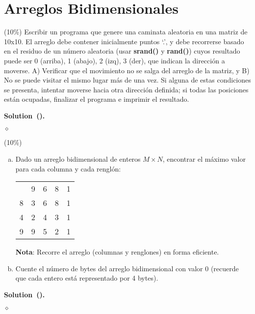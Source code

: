 \documentclass{article}
\theoremstyle{problemstyle}
\newenvironment{solution}[2]{%
  \begin{mdframed}[linewidth=0.8pt,linecolor=Gray,backgroundcolor=Gray!5,roundcorner=5pt, nobreak=#2]%
    \noindent\textbf{Solution\if\relax\detokenize{#1}\relax\else~(#1)\fi.}%
}{%
\hfill $ \diamond $ 
  \end{mdframed}%
}
\begin{document}
\section*{Arreglos Bidimensionales}\label{sec:arreglos_bidimensionales} %
\begin{problem}
(10\%) Escribir un programa que genere una caminata aleatoria en una matriz de 10x10. El arreglo debe contener inicialmente puntos `.', y debe recorrerse basado en el residuo de un n\'umero aleatoria (usar \textbf{srand()} y \textbf{rand()}) cuyos resultado puede ser {0 (arriba), 1 (abajo), 2 (izq), 3 (der)}, que indican la direcci\'on a moverse. A) Verificar que el movimiento no se salga del arreglo de la matriz, y B) No se puede visitar el mismo lugar más de una vez. Si alguna de estas condiciones se presenta, intentar moverse hacia otra direcci\'on definida; si todas las posiciones están ocupadas, finalizar el programa e imprimir el resultado.
\end{problem}

\begin{solution}{}{false}
	
\end{solution}

\begin{problem}
(10\%)
\begin{enumerate}[a)]
	\item Dado un arreglo bidimensional de enteros $ M\times N $, encontrar el m\'aximo valor para cada columna y cada rengl\'on:
	      \setlength\doublerulesep{0.5pt}
	      \begin{center}
		      \begin{tabular}[c]{|c||c|c|c|c|}
			      \hline
			        & 9 & 6 & 8 & 1 \\
			      \hhline{|=#=|=|=|=|}
			      8 & 3 & 6 & 8 & 1 \\
			      \hline
			      4 & 2 & 4 & 3 & 1 \\
			      \hline
			      9 & 9 & 5 & 2 & 1 \\
			      \hline
		      \end{tabular}
	      \end{center}
	      \textbf{Nota}: Recorre el arreglo (columnas y renglones) en forma eficiente.

	\item Cuente el n\'umero de bytes del arreglo bidimensional con valor 0 (recuerde que cada entero est\'a representado por 4 bytes).
\end{enumerate}

\end{problem}
\begin{solution}{}{false}
	
\end{solution}
\end{document}
